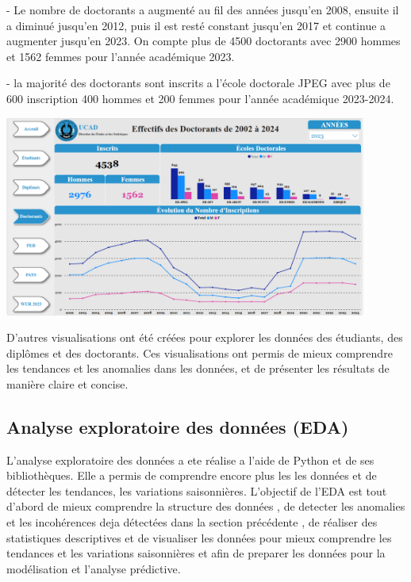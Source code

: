 \begin{itemize}
    - Le nombre de doctorants a augmenté au fil des années jusqu'en 2008, ensuite il a diminué jusqu'en 2012, puis il est resté constant jusqu'en 2017 et continue a augmenter jusqu'en 2023. On compte plus de 4500 doctorants avec 2900 hommes et 1562 femmes   pour l'année académique 2023.

    - la majorité des doctorants sont inscrits a l'école doctorale JPEG avec plus de 600 inscription 400 hommes et 200 femmes pour l'année académique 2023-2024. 

    \begin{center}
    \includegraphics[width=0.9\textwidth]{image/doc.png} 
    \end{center}

  
\end{itemize}     

D'autres visualisations ont été créées pour explorer les données des étudiants, des diplômes et des doctorants. Ces visualisations ont permis de mieux comprendre les tendances et les anomalies dans les données, et de présenter les résultats de manière claire et concise. 


\subsection{Analyse exploratoire des données (EDA)}  
L'analyse exploratoire des données a ete réalise a l'aide de Python et de ses bibliothèques. Elle a permis de comprendre encore plus les les données et de détecter les tendances, les variations saisonnières.
L'objectif de l'EDA est tout d'abord de mieux comprendre la structure des données , de detecter les anomalies et les incohérences deja détectées dans la section précédente , de réaliser des statistiques descriptives et de visualiser les données pour mieux comprendre les tendances et les variations saisonnières et afin de preparer les données pour la modélisation et l'analyse prédictive. 

